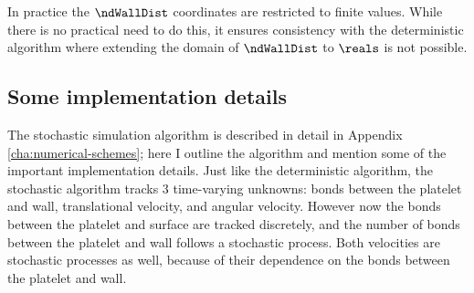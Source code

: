 In practice the $\ndWallDist$ coordinates are restricted to finite
values. While there is no practical need to do this, it ensures
consistency with the deterministic algorithm where extending the
domain of $\ndWallDist$ to $\reals$ is not possible.

\subsection{Some implementation details}
\label{sec:some-impl-deta}

The stochastic simulation algorithm is described in detail in Appendix
\ref{cha:numerical-schemes}; here I outline the algorithm and mention
some of the important implementation details. Just like the
deterministic algorithm, the stochastic algorithm tracks 3
time-varying unknowns: bonds between the platelet and wall,
translational velocity, and angular velocity. However now the bonds
between the platelet and surface are tracked discretely, and the
number of bonds between the platelet and wall follows a stochastic
process. Both velocities are stochastic processes as well, because of
their dependence on the bonds between the platelet and wall.

